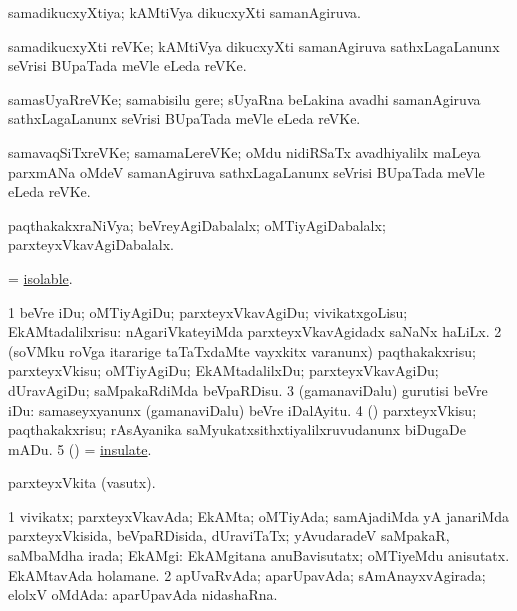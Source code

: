 \bentry
{}
\gl{\gu}
\bmng
samadikucxyXtiya; kAMtiVya dikucxyXti samanAgiruva. 
\emng
\eentry

\bentry
{}
\gl{\nA}
\bmng
samadikucxyXti reVKe; kAMtiVya dikucxyXti samanAgiruva sathxLagaLanunx seVrisi BUpaTada meVle eLeda reVKe. 
\emng
\eentry

\bentry
{}
\gl{\nA}
\bmng
samasUyaRreVKe; samabisilu gere; sUyaRna beLakina avadhi samanAgiruva sathxLagaLanunx seVrisi BUpaTada meVle eLeda reVKe. 
\emng
\eentry

\bentry
{}
\gl{\nA}
\bmng
samavaqSiTxreVKe; samamaLereVKe; oMdu nidiRSaTx avadhiyalilx maLeya parxmANa oMdeV samanAgiruva sathxLagaLanunx seVrisi BUpaTada meVle eLeda reVKe. 
\emng
\eentry

\bentry
{}
\gl{\gu}
\bmng
paqthakakxraNiVya; beVreyAgiDabalalx; oMTiyAgiDabalalx; parxteyxVkavAgiDabalalx. 
\emng
\eentry

\bentry
{}
\gl{\gu}
\bmng
=  \hyperlink{isolable}{isolable}. 
\emng
\eentry

\bentry
{}
\gl{\sakirx}
\bmng
\bnum
\num{1} beVre iDu; oMTiyAgiDu; parxteyxVkavAgiDu; vivikatxgoLisu; EkAMtadalilxrisu:  nAgariVkateyiMda parxteyxVkavAgidadx saNaNx haLiLx. 
\num{2} (soVMku roVga itararige taTaTxdaMte vayxkitx \mo varanunx) paqthakakxrisu; parxteyxVkisu; oMTiyAgiDu; EkAMtadalilxDu; parxteyxVkavAgiDu; dUravAgiDu; saMpakaRdiMda beVpaRDisu. 
\num{3} (gamanaviDalu) gurutisi beVre iDu:  samaseyxyanunx (gamanaviDalu) beVre iDalAyitu. 
\num{4} (\ravi) parxteyxVkisu; paqthakakxrisu; rAsAyanika saMyukatxsithxtiyalilxruvudanunx biDugaDe mADu. 
\num{5} (\viduyx) =  \hyperlink{insulate}{insulate}. 
\enum
\emng
\eentry

\bentry
{}
\gl{\nA}
\bmng
parxteyxVkita (vasutx). 
\emng
\eentry

\bentry
{}
\gl{\gu}
\bmng
\bnum
\num{1} vivikatx; parxteyxVkavAda; EkAMta; oMTiyAda; samAjadiMda yA janariMda parxteyxVkisida, beVpaRDisida, dUraviTaTx; yAvudaradeV saMpakaR, saMbaMdha irada; EkAMgi:  EkAMgitana anuBavisutatx; oMTiyeMdu anisutatx.  EkAMtavAda holamane. 
\num{2} apUvaRvAda; aparUpavAda; sAmAnayxvAgirada; elolxV oMdAda:  aparUpavAda nidashaRna. 
\enum
\emng
\eentry

